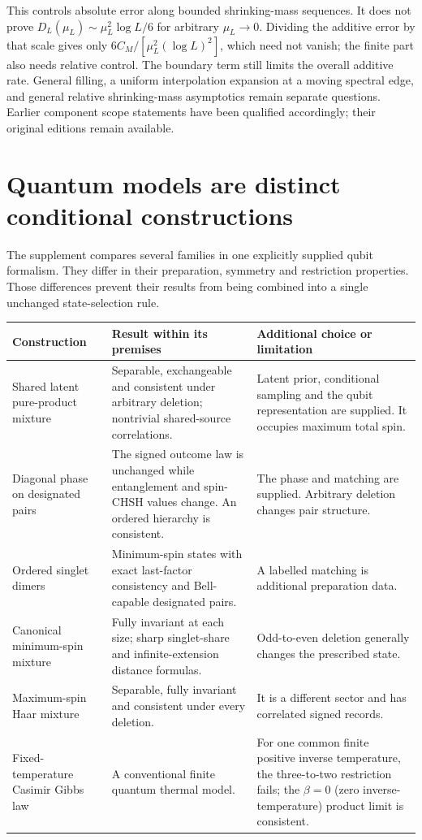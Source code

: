 This controls absolute error along bounded shrinking-mass sequences. It does not prove $D_L(\mu_L)\sim\mu_L^2\log L/6$ for arbitrary $\mu_L\to0$. Dividing the additive error by that scale gives only $6C_M/[\mu_L^2(\log L)^2]$, which need not vanish; the finite part also needs relative control. The boundary term still limits the overall additive rate. General filling, a uniform interpolation expansion at a moving spectral edge, and general relative shrinking-mass asymptotics remain separate questions. Earlier component scope statements have been qualified accordingly; their original editions remain available.

\section{Quantum models are distinct conditional constructions}
\label{col:quantum}

The supplement compares several families in one explicitly supplied qubit formalism. They differ in their preparation, symmetry and restriction properties. Those differences prevent their results from being combined into a single unchanged state-selection rule.

\begin{longtable}{@{}p{}p{}p{}@{}}
\toprule
Construction & Result within its premises & Additional choice or limitation\\
\midrule
\endhead
Shared latent pure-product mixture &
Separable, exchangeable and consistent under arbitrary deletion; nontrivial shared-source correlations. &
Latent prior, conditional sampling and the qubit representation are supplied. It occupies maximum total spin.\\
Diagonal phase on designated pairs &
The signed outcome law is unchanged while entanglement and spin-CHSH values change. An ordered hierarchy is consistent. &
The phase and matching are supplied. Arbitrary deletion changes pair structure.\\
Ordered singlet dimers &
Minimum-spin states with exact last-factor consistency and Bell-capable designated pairs. &
A labelled matching is additional preparation data.\\
Canonical minimum-spin mixture &
Fully invariant at each size; sharp singlet-share and infinite-extension distance formulas. &
Odd-to-even deletion generally changes the prescribed state.\\
Maximum-spin Haar mixture &
Separable, fully invariant and consistent under every deletion. &
It is a different sector and has correlated signed records.\\
Fixed-temperature Casimir Gibbs law &
A conventional finite quantum thermal model. &
For one common finite positive inverse temperature, the three-to-two restriction fails; the \(\beta=0\) (zero inverse-temperature) product limit is consistent.\\
\bottomrule
\end{longtable}

